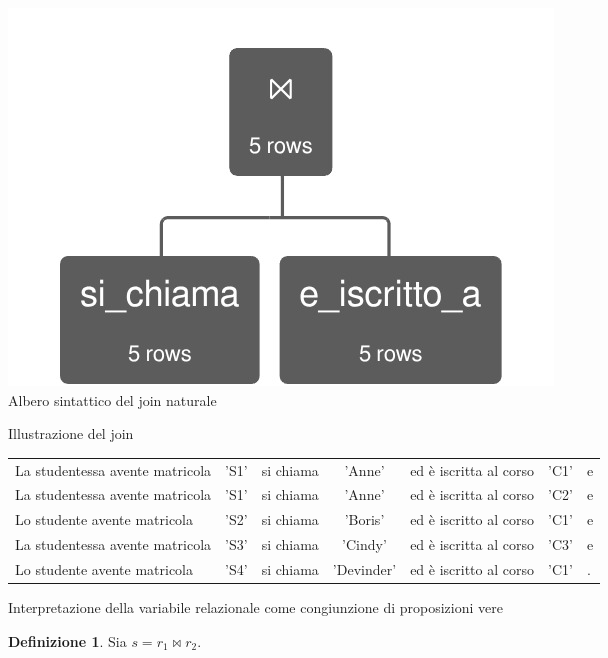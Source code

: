 \documentclass[withtimes]{easychair}
\theoremstyle{definition}
\newtheorem{definition}{Definizione}
\begin{document}
\begin{figure}[htp]
	\centering	
	\begin{subfigure}[t]{.75\textwidth}
		\centering
		\includegraphics[width=.4\textwidth]{img/inner_join}
		\caption{Albero sintattico del join naturale}\label{fig:inner-join-syn-tree}
	\end{subfigure}

	\vspace{1cm}	
		
	\begin{subfigure}[t]{\textwidth}
		\centering
		
      \caption{Illustrazione del join\label{fig:table-join}}
	\end{subfigure}

	\vspace{1cm}	
	
	\begin{subfigure}[t]{\textwidth}
		\centering
\begin{tabular}{lclclcl}
La studentessa avente matricola & 'S1' & si chiama & 'Anne' & ed è iscritta al corso & 'C1' & e \\
La studentessa avente matricola & 'S1' & si chiama & 'Anne' & ed è iscritta al corso & 'C2' & e \\
Lo studente avente matricola & 'S2' & si chiama & 	'Boris'& ed è iscritto al corso & 'C1' & e \\
La studentessa avente matricola & 'S3' & si chiama & 'Cindy'& ed è iscritta al corso & 'C3' &  e \\
Lo studente avente matricola & 'S4' & si chiama & 'Devinder'& ed è iscritto al corso & 'C1' & . \\
\end{tabular}
\caption{Interpretazione della variabile relazionale come congiunzione di proposizioni vere}\label{fig:proposizioni}
	\end{subfigure}
		
	\vspace{1cm}	

	\begin{subfigure}[t]{\textwidth}
		\centering
		\begin{definition}
		Sia $s = r_1 \bowtie r_2$.


\end{definition}
\end{subfigure}
\end{figure}
\end{document}
